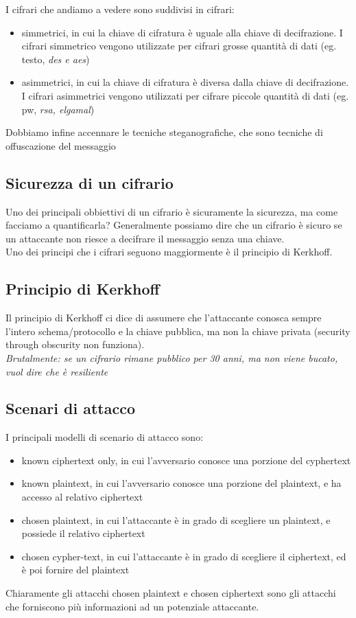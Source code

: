 \documentclass[11pt, oneside]{article}   	%
\begin{document}
I cifrari che andiamo a vedere sono suddivisi in cifrari:
\begin{itemize}
\item simmetrici, in cui la chiave di cifratura è uguale alla chiave di decifrazione. I cifrari simmetrico vengono utilizzate per cifrari grosse quantità di dati (eg. testo, \emph{des e aes})
\item asimmetrici, in cui la chiave di cifratura è diversa dalla chiave di decifrazione. I cifrari asimmetrici vengono utilizzati per cifrare piccole quantità di dati (eg. pw, \emph{rsa, elgamal})
\end{itemize}
Dobbiamo infine accennare le tecniche steganografiche, che sono tecniche di offuscazione del messaggio

\subsection*{Sicurezza di un cifrario}
Uno dei principali obbiettivi di un cifrario è sicuramente la sicurezza, ma come facciamo a quantificarla? Generalmente possiamo dire che un cifrario è sicuro se un attaccante non riesce a decifrare il messaggio senza una chiave. \\Uno dei principi che i cifrari seguono maggiormente è il principio di Kerkhoff.
\subsection*{Principio di Kerkhoff}
Il principio di Kerkhoff ci dice di assumere che l'attaccante conosca sempre l'intero schema/protocollo e la chiave pubblica, ma non la chiave privata (security through obscurity non funziona).\\
\emph{Brutalmente: se un cifrario rimane pubblico per 30 anni, ma non viene bucato, vuol dire che è resiliente}
\subsection*{Scenari di attacco}
I principali modelli di scenario di attacco sono:
\begin{itemize}
\item known ciphertext only, in cui l'avversario conosce una porzione del cyphertext
\item known plaintext, in cui l'avversario conosce una porzione del plaintext, e ha accesso al relativo ciphertext
\item chosen plaintext, in cui l'attaccante è in grado di scegliere un plaintext, e possiede il relativo ciphertext
\item chosen cypher-text, in cui l'attaccante è in grado di scegliere il ciphertext, ed è poi fornire del plaintext
\end{itemize}
Chiaramente gli attacchi chosen plaintext e chosen ciphertext sono gli attacchi che forniscono più informazioni ad un potenziale attaccante.
\end{document}

